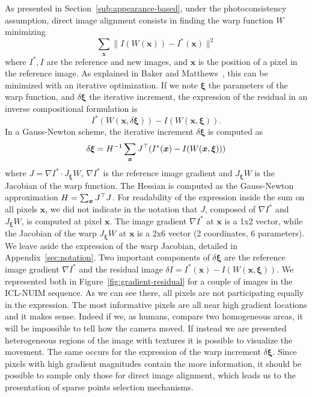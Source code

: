 As presented in Section~\ref{sub:appearance-based},
under the photoconsistency assumption, direct image alignment consists
in finding the warp function $W$ minimizing
\[
	\sum_{\bm{x}}\|I(W(\bm{x})) - I^{*}(\bm{x})\|^2
\]
where $I^{*}, I$ are the reference and new images,
and $\bm{x}$ is the position of a pixel in the reference image.
As explained in Baker and Matthews~\cite{baker2004lucas},
this can be minimized with an iterative optimization.
If we note $\bm{\xi}$ the parameters of the warp function,
and $\delta\bm{\xi}$ the iterative increment,
the expression of the residual in an inverse compositional formulation is
\[
	I^{*}(W(\bm{x}, \delta \bm{\xi})) - I(W(\bm{x}, \bm{\xi})).
\]
In a Gauss-Newton scheme, the iterative increment $\delta\bm{\xi}$ is computed as
\[
	\delta \bm{\xi} = H^{-1} \sum_{\bm{x}} J^{\top} (I^{*}(\bm{x}) - I(W(\bm{x}, \bm{\xi})))
\]
where $J = \nabla I^{*} \cdot J_{\bm{\xi}}W$, $\nabla I^{*}$ is the reference image gradient
and $J_{\bm{\xi}}W$ is the Jacobian of the warp function.
The Hessian is computed as the Gauss-Newton approximation
$H = \sum_{\bm{x}}J^{\top}J$.
For readability of the expression inside the sum on all pixels $\bm{x}$,
we did not indicate in the notation that $J$,
composed of $\nabla I^{*}$ and  $J_{\bm{\xi}}W$, is computed at pixel $\bm{x}$.
The image gradient $\nabla I^{*}$ at $\bm{x}$ is a 1x2 vector,
while the Jacobian of the warp $J_{\bm{\xi}}W$ at $\bm{x}$ is a 2x6 vector (2 coordinates, 6 parameters).
We leave aside the expression of the warp Jacobian, detailed in Appendix~\ref{sec:notation}.
Two important components of $\delta \bm{\xi}$
are the reference image gradient $\nabla I^{*}$
and the residual image $\delta I = I^{*}(\bm{x}) - I(W(\bm{x}, \bm{\xi}))$.
We represented both in Figure~\ref{fig:gradient-residual}
for a couple of images in the ICL-NUIM sequence.
As we can see there, all pixels are not participating equally in the expression.
The most informative pixels are all near high gradient locations and it makes sense.
Indeed if we, as humans, compare two homogeneous areas,
it will be impossible to tell how the camera moved.
If instead we are presented heterogeneous regions of the image with textures
it is possible to visualize the movement.
The same occurs for the expression of the warp increment $\delta \bm{\xi}$.
Since pixels with high gradient magnitudes contain the more information,
it should be possible to sample only those for direct image alignment,
which leads us to the presentation of sparse points selection mechanisms.


